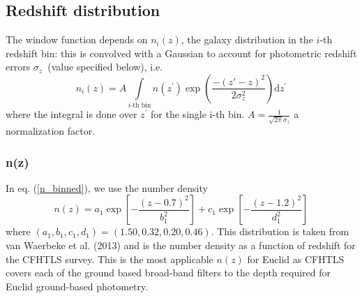 \subsection{Redshift distribution}

The window function depends on $n_{i}(z)$, the galaxy distribution
in the $i$-th redshift bin: this is convolved with a Gaussian to account for photometric
redshift errors $\sigma_{z}$~(value specified below), i.e.~
\begin{equation}
n_{i}(z)=A \int\limits _{i\text{-th bin}}n({z^\prime})\exp\left(\frac{-(z\prime-z)^{2}}{2 \sigma_{z}^{2}}\right)\mathrm{d}{z^\prime}
\label{n_binned}
\end{equation}
where the integral is done over $z^\prime$ for the single i-th bin. 
$A = \frac{1}{\sqrt{2\pi} \sigma_z}$ a normalization factor.

\subsubsection{n(z)}
In eq. (\ref{n_binned}), we use the number density
\begin{equation}
n(z) = a_1\exp\left[-\frac{(z-0.7)^2}{b_1^2}\right]+c_1\exp\left[-\frac{(z-1.2)^2}{d_1^2}\right]
\end{equation}
where $(a_1, b_1, c_1, d_1)=(1.50, 0.32, 0.20, 0.46)$. This distribution is taken from van Waerbeke et al. (2013) and 
is the number density as a function of redshift for the CFHTLS survey. This is the most applicable $n(z)$ for Euclid as 
CFHTLS covers each of the ground based broad-band filters to the depth required for Euclid ground-based photometry. 


